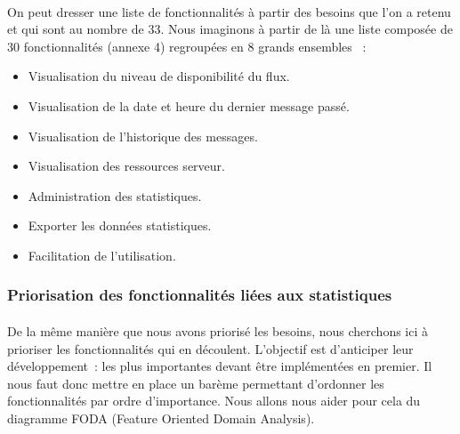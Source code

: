 			\paragraph{}%
			On peut dresser une liste de fonctionnalités à partir des besoins que l'on a
			retenu et qui sont au nombre de 33.
			Nous imaginons à partir de là une liste composée de 30 fonctionnalités
			(annexe 4) regroupées en 8 grands ensembles \label{ensembles_fonctios}~:
			\begin{itemize}
			  \item Visualisation du niveau de disponibilité du flux.
			  \item Visualisation de la date et heure du dernier message passé.
			  \item Visualisation de l’historique des messages.
			  \item Visualisation des ressources serveur.
			  \item Administration des statistiques.
			  \item Exporter les données statistiques.
			  \item Facilitation de l’utilisation.
			\end{itemize}
			
		\subsubsection{Priorisation des fonctionnalités liées aux statistiques}
			\paragraph{}%
			De la même manière que nous avons priorisé les besoins, nous cherchons ici à
			prioriser les fonctionnalités qui en découlent. L'objectif est
			d'anticiper leur développement~: les plus importantes
			devant être implémentées en premier. Il nous faut donc mettre en place un
			barème permettant d'ordonner les fonctionnalités par ordre d'importance. Nous
			allons nous aider pour cela du diagramme FODA (Feature Oriented Domain
			Analysis).
			
